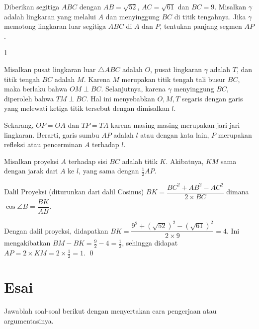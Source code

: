 \documentclass[12pt]{scrartcl}
\begin{document}
	\begin{soaljawab}
		Diberikan segitiga $ABC$ dengan $AB = \sqrt{52}$, $AC=\sqrt{61}$ dan $BC = 9$. Misalkan $\gamma$
		adalah lingkaran yang melalui $A$ dan menyinggung $BC$ di titik tengahnya. Jika $\gamma$
		memotong lingkaran luar segitiga $ABC$ di $A$ dan $P$, tentukan panjang segmen $AP$.
		
		\begin{jawaban}
		1
		\end{jawaban}
		\begin{solusi}
		Misalkan pusat lingkaran luar $\triangle ABC$ adalah $O$, pusat lingkaran $\gamma$ adalah $T$, dan titik tengah $BC$ adalah $M$. Karena $M$ merupakan titik tengah tali busur $BC$, maka berlaku bahwa $OM \perp BC$. Selanjutnya, karena $\gamma$ menyinggung $BC$, diperoleh bahwa $TM \perp BC$. Hal ini menyebabkan $O,M,T$ segaris dengan garis yang melewati ketiga titik tersebut dengan dimisalkan $l$. 
		
		Sekarang, $OP=OA$ dan $TP=TA$ karena masing-masing merupakan jari-jari lingkaran. Berarti, garis sumbu $AP$ adalah $l$ atau dengan kata lain, $P$ merupakan refleksi atau pencerminan $A$ terhadap $l$. 
		
		Misalkan proyeksi $A$ terhadap sisi $BC$ adalah titik $K$. Akibatnya, $KM$ sama dengan jarak dari $A$ ke $l$, yang sama dengan $\frac{1}{2}AP$. 
		
		\begin{lemmarev}
		Dalil Proyeksi (diturunkan dari dalil Cosinus) $BK = \dfrac{BC^2+AB^2-AC^2}{2\times BC}$
		dimana $\cos \angle B = \dfrac{BK}{AB}$.
		\end{lemmarev}
		
		Dengan dalil proyeksi, didapatkan $BK = \dfrac{9^2+(\sqrt{52})^2-(\sqrt{61})^2}{2\times 9}=4$. Ini mengakibatkan $BM-BK = \frac{9}{2}-4=\frac{1}{2}$, sehingga didapat $AP=2\times KM=2 \times \frac{1}{2}=1$. \qed
		

		\end{solusi}
	\end{soaljawab}
	\newpage
	\section{Esai}
	Jawablah soal-soal berikut dengan menyertakan cara pengerjaan atau argumentasinya.
	
\end{document}
